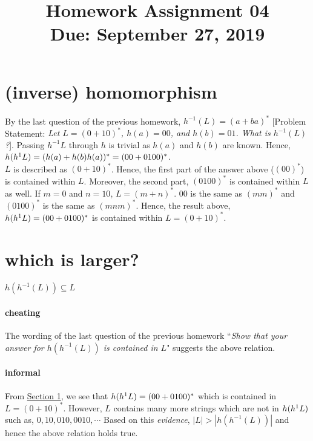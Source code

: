 \documentclass[11pt,letterpaper]{article}
\title{Homework Assignment 04 \\
    \small Due: September 27, 2019}
\begin{document}
\maketitle

\section{(inverse) homomorphism}
\label{sec:1}
By the last question of the previous homework, 
$h^{-1}(L) = (a+ba)^*$ 
[Problem Statement: \textit{Let $L=(0+10)^*$, $h(a)=00$, and $h(b)=01$. What is $h^{-1}(L)$?}]. 
Passing $h^{-1}{L}$ through $h$ is trivial as $h(a)$ and $h(b)$ are known. Hence, $h(h^{\-1}{L}) = (h(a) + h(b)h(a))^* = (00+0100)^*$. \\
$L$ is described as $(0+10)^*$. Hence, the first part of the answer above ($(00)^*$) is contained within $L$. Moreover, the second part, $(0100)^*$ is contained within $L$ as well. \small{If $m=0$ and $n=10$, $L=(m+n)^*$. $00$ is the same as $(mm)^*$ and $(0100)^*$ is the same as $(mnm)^*$.} 
Hence, the result above, $h(h^{\-1}{L}) = (00+0100)^*$ is contained within $L = (0+10)^*$.

\section{which is larger?}
\begin{center}
    $h(h^{-1}(L)) \subseteq	L$
\end{center}
\paragraph{cheating}
The wording of the last question of the previous homework ``\textit{Show that your answer for $h(h^{-1}(L))$ is contained in $L$}" suggests the above relation.
\paragraph{informal}
From \hyperref[sec:1]{Section 1}, we see that $h(h^{\-1}{L}) = (00+0100)^*$ which is contained in $L=(0+10)^*$. However, $L$ contains many more strings which are not in $h(h^{\-1}{L})$ such as, $0, 10, 010, 0010, \cdots$ Based on this \textit{evidence}, $|L| > |h(h^{-1}(L))|$ and hence the above relation holds true.
\end{document}
